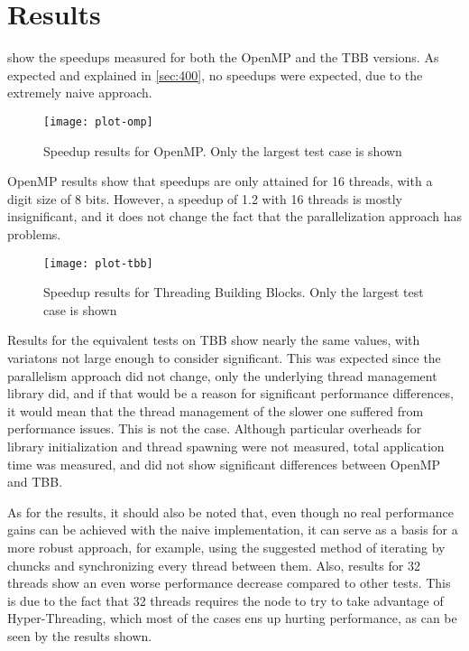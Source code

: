 \section{Results}
\label{sec:800}

 show the speedups measured for both the OpenMP and the TBB versions. As expected and explained in \cref{sec:400}, no speedups were expected, due to the extremely naive approach.

\begin{figure}[!htp]
	\centering
	\texttt{[image: plot-omp]}
	\caption{Speedup results for OpenMP. Only the largest test case is shown}
	\label{fig:omp}
\end{figure}

OpenMP results show that speedups are only attained for 16 threads, with a digit size of 8 bits. However, a speedup of 1.2 with 16 threads is mostly insignificant, and it does not change the fact that the parallelization approach has problems.

\begin{figure}[!htp]
	\centering
	\texttt{[image: plot-tbb]}
	\caption{Speedup results for Threading Building Blocks. Only the largest test case is shown}
	\label{fig:tbb}
\end{figure}

Results for the equivalent tests on TBB show nearly the same values, with variatons not large enough to consider significant. This was expected since the parallelism approach did not change, only the underlying thread management library did, and if that would be a reason for significant performance differences, it would mean that the thread management of the slower one suffered from performance issues. This is not the case. Although particular overheads for library initialization and thread  spawning were not measured, total application time was measured, and did not show significant differences between OpenMP and TBB.

As for the results, it should also be noted that, even though no real performance gains can be achieved with the naive implementation, it can serve as a basis for a more robust approach, for example, using the suggested method of iterating by chuncks and synchronizing every thread between them. Also, results for 32 threads show an even worse performance decrease compared to other tests. This is due to the fact that 32 threads requires the node to try to take advantage of Hyper-Threading, which most of the cases ens up hurting performance, as can be seen by the results shown.

